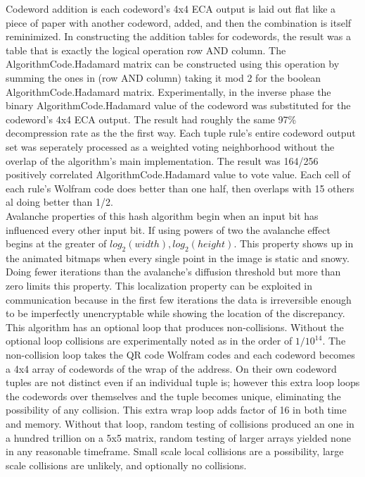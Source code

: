 \documentclass[11pt]{article}
\begin{document}
Codeword addition is each codeword's 4x4 ECA output is laid out flat like a piece of paper with another codeword, added, and then the combination is itself reminimized. In constructing the addition tables for codewords, the result was a table that is exactly the logical operation row AND column. The AlgorithmCode.Hadamard matrix can be constructed using this operation by summing the ones in (row AND column) taking it mod 2 for the boolean AlgorithmCode.Hadamard matrix. Experimentally, in the inverse phase the binary AlgorithmCode.Hadamard value of the codeword was substituted for the codeword's 4x4 ECA output. The result had roughly the same 97\% decompression rate as the the first way. Each tuple rule's entire codeword output set was seperately processed as a weighted voting neighborhood without the overlap of the algorithm's main implementation. The result was 164/256 positively correlated AlgorithmCode.Hadamard value to vote value. Each cell of each rule's Wolfram code does better than one half, then overlaps with 15 others al doing better than 1/2.\\

Avalanche properties of this hash algorithm begin when an input bit has influenced every other input bit. If using powers of two the avalanche effect begins at the greater of $log_2 (width) , log_2 (height)$. This property shows up in the animated bitmaps when every single point in the image is static and snowy. Doing fewer iterations than the avalanche's diffusion threshold but more than zero limits this property. This localization property can be exploited in communication because in the first few iterations the data is irreversible enough to be imperfectly unencryptable while showing the location of the discrepancy.\\

This algorithm has an optional loop that produces non-collisions. Without the optional loop collisions are experimentally noted as in the order of $1/10^14$. The non-collision loop takes the QR code Wolfram codes and each codeword becomes a 4x4 array of codewords of the wrap of the address. On their own codeword tuples are not distinct even if an individual tuple is; however this extra loop loops the codewords over themselves and the tuple becomes unique, eliminating the possibility of any collision. This extra wrap loop adds factor of 16 in both time and memory. Without that loop, random testing of collisions produced an one in a hundred trillion on a 5x5 matrix, random testing of larger arrays yielded none in any reasonable timeframe. Small scale local collisions are a possibility, large scale collisions are unlikely, and optionally no collisions.\\
\end{document}
